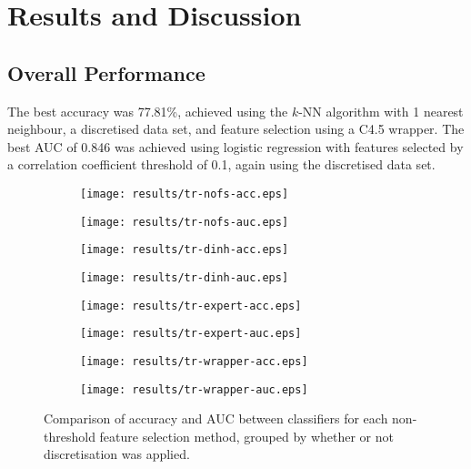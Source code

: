 \documentclass{article}
\begin{document}
\section{Results and Discussion}
\label{sec:results}

\subsection{Overall Performance}
The best accuracy was 77.81\%, achieved using the $k$-NN algorithm
with 1 nearest neighbour, a discretised data set, and feature selection using a
C4.5 wrapper. The best AUC of 0.846 was achieved using logistic regression with
features selected by a correlation coefficient threshold of 0.1, again
using the discretised data set.

\begin{figure*}[htbp]
\begin{subfigure}{.50\textwidth}
\texttt{[image: results/tr-nofs-acc.eps]}
\caption{}
\label{}
\end{subfigure}%
\begin{subfigure}{.57\textwidth}
\texttt{[image: results/tr-nofs-auc.eps]}
\caption{}
\label{}
\end{subfigure}

\begin{subfigure}{.50\textwidth}
\texttt{[image: results/tr-dinh-acc.eps]}
\caption{}
\label{}
\end{subfigure}%
\begin{subfigure}{.57\textwidth}
\texttt{[image: results/tr-dinh-auc.eps]}
\caption{}
\label{}
\end{subfigure}

\begin{subfigure}{.50\textwidth}
\texttt{[image: results/tr-expert-acc.eps]}
\caption{}
\label{}
\end{subfigure}%
\begin{subfigure}{.57\textwidth}
\texttt{[image: results/tr-expert-auc.eps]}
\caption{}
\label{}
\end{subfigure}

\begin{subfigure}{.50\textwidth}
\texttt{[image: results/tr-wrapper-acc.eps]}
\caption{}
\label{}
\end{subfigure}%
\begin{subfigure}{.57\textwidth}
\texttt{[image: results/tr-wrapper-auc.eps]}
\caption{}
\label{}
\end{subfigure}
\caption[]{Comparison of accuracy and AUC between classifiers for each non-threshold feature selection method, grouped by whether or not discretisation was applied.}
\label{}
\end{figure*}
\end{document}

